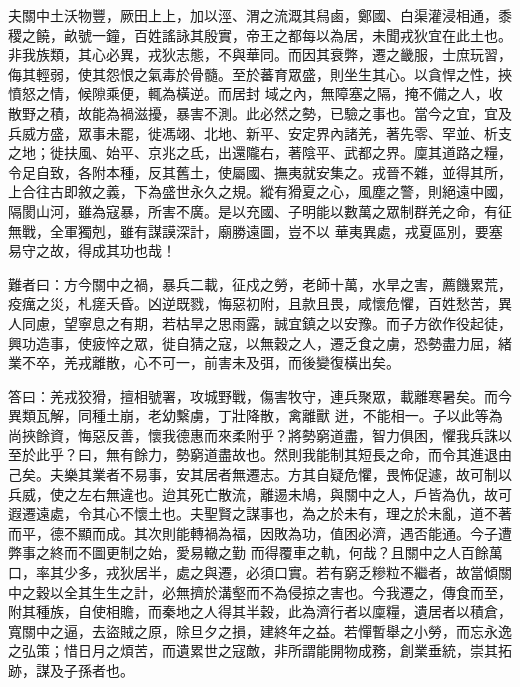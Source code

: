 \begin{pinyinscope}
 夫關中土沃物豐，厥田上上，加以涇、渭之流溉其舄鹵，鄭國、白渠灌浸相通，黍稷之饒，畝號一鐘，百姓謠詠其殷實，帝王之都每以為居，未聞戎狄宜在此土也。非我族類，其心必異，戎狄志態，不與華同。而因其衰弊，遷之畿服，士庶玩習，侮其輕弱，使其怨恨之氣毒於骨髓。至於蕃育眾盛，則坐生其心。以貪悍之性，挾憤怒之情，候隙乘便，輒為橫逆。而居封
 域之內，無障塞之隔，掩不備之人，收散野之積，故能為禍滋擾，暴害不測。此必然之勢，已驗之事也。當今之宜，宜及兵威方盛，眾事未罷，徙馮翊、北地、新平、安定界內諸羌，著先零、罕並、析支之地；徙扶風、始平、京兆之氐，出還隴右，著陰平、武都之界。廩其道路之糧，令足自致，各附本種，反其舊土，使屬國、撫夷就安集之。戎晉不雜，並得其所，上合往古即敘之義，下為盛世永久之規。縱有猾夏之心，風塵之警，則絕遠中國，隔閡山河，雖為寇暴，所害不廣。是以充國、子明能以數萬之眾制群羌之命，有征無戰，全軍獨剋，雖有謀謨深計，廟勝遠圖，豈不以
 華夷異處，戎夏區別，要塞易守之故，得成其功也哉！



 難者曰：方今關中之禍，暴兵二載，征戍之勞，老師十萬，水旱之害，薦饑累荒，疫癘之災，札瘥夭昏。凶逆既戮，悔惡初附，且款且畏，咸懷危懼，百姓愁苦，異人同慮，望寧息之有期，若枯旱之思雨露，誠宜鎮之以安豫。而子方欲作役起徒，興功造事，使疲悴之眾，徙自猜之寇，以無穀之人，遷乏食之虜，恐勢盡力屈，緒業不卒，羌戎離散，心不可一，前害未及弭，而後變復橫出矣。



 答曰：羌戎狡猾，擅相號署，攻城野戰，傷害牧守，連兵聚眾，載離寒暑矣。而今異類瓦解，同種土崩，老幼繫虜，丁壯降散，禽離獸
 迸，不能相一。子以此等為尚挾餘資，悔惡反善，懷我德惠而來柔附乎？將勢窮道盡，智力俱困，懼我兵誅以至於此乎？曰，無有餘力，勢窮道盡故也。然則我能制其短長之命，而令其進退由己矣。夫樂其業者不易事，安其居者無遷志。方其自疑危懼，畏怖促遽，故可制以兵威，使之左右無違也。迨其死亡散流，離逷未鳩，與關中之人，戶皆為仇，故可遐遷遠處，令其心不懷土也。夫聖賢之謀事也，為之於未有，理之於未亂，道不著而平，德不顯而成。其次則能轉禍為福，因敗為功，值困必濟，遇否能通。今子遭弊事之終而不圖更制之始，愛易轍之勤
 而得覆車之軌，何哉？且關中之人百餘萬口，率其少多，戎狄居半，處之與遷，必須口實。若有窮乏糝粒不繼者，故當傾關中之穀以全其生生之計，必無擠於溝壑而不為侵掠之害也。今我遷之，傳食而至，附其種族，自使相贍，而秦地之人得其半穀，此為濟行者以廩糧，遺居者以積倉，寬關中之逼，去盜賊之原，除旦夕之損，建終年之益。若憚暫舉之小勞，而忘永逸之弘策；惜日月之煩苦，而遺累世之寇敵，非所謂能開物成務，創業垂統，崇其拓跡，謀及子孫者也。




\end{pinyinscope}
